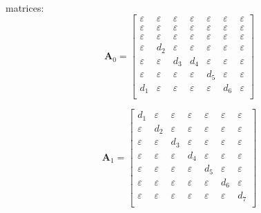 \documentclass[11pt, a4paper, fleqn]{article}
\begin{document}
\\
matrices:
\begin{equation*}
\mathbf{A}_{0} = 
\left[\begin{array}{ ccccccc }
\varepsilon	&\varepsilon	&\varepsilon	&\varepsilon	&\varepsilon	&\varepsilon	&\varepsilon\\
\varepsilon	&\varepsilon	&\varepsilon	&\varepsilon	&\varepsilon	&\varepsilon	&\varepsilon\\
\varepsilon	&\varepsilon	&\varepsilon	&\varepsilon	&\varepsilon	&\varepsilon	&\varepsilon\\
\varepsilon	&d_2	&\varepsilon	&\varepsilon	&\varepsilon	&\varepsilon	&\varepsilon\\
\varepsilon	&\varepsilon	&d_3	&d_4	&\varepsilon	&\varepsilon	&\varepsilon\\
\varepsilon	&\varepsilon	&\varepsilon	&\varepsilon	&d_5	&\varepsilon	&\varepsilon\\
d_1	&\varepsilon	&\varepsilon	&\varepsilon	&\varepsilon	&d_6	&\varepsilon\\
\end{array}\right]
\end{equation*}

\begin{equation*}
\mathbf{A}_{1} = 
\left[\begin{array}{ ccccccc }
d_1	&\varepsilon	&\varepsilon	&\varepsilon	&\varepsilon	&\varepsilon	&\varepsilon\\
\varepsilon	&d_2	&\varepsilon	&\varepsilon	&\varepsilon	&\varepsilon	&\varepsilon\\
\varepsilon	&\varepsilon	&d_3	&\varepsilon	&\varepsilon	&\varepsilon	&\varepsilon\\
\varepsilon	&\varepsilon	&\varepsilon	&d_4	&\varepsilon	&\varepsilon	&\varepsilon\\
\varepsilon	&\varepsilon	&\varepsilon	&\varepsilon	&d_5	&\varepsilon	&\varepsilon\\
\varepsilon	&\varepsilon	&\varepsilon	&\varepsilon	&\varepsilon	&d_6	&\varepsilon\\
\varepsilon	&\varepsilon	&\varepsilon	&\varepsilon	&\varepsilon	&\varepsilon	&d_7\\
\end{array}\right]
\end{equation*}
\end{document}
